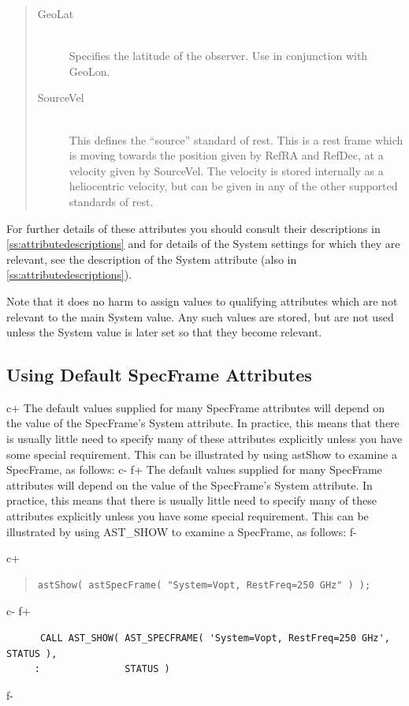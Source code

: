 \documentclass[twoside,11pt]{article}
\newcommand{\appref}[1]{Appendix~\ref{#1}}
\renewcommand{\appref}[1]{\ref{#1}}
\begin{document}
\begin{quote}
\begin{description}
\item[GeoLat]\mbox{}\\
Specifies the latitude of the observer. Use in conjunction with GeoLon.

\item[SourceVel]\mbox{}\\
This defines the ``source'' standard of rest. This is a rest frame which
is moving towards the position given by RefRA and RefDec, at a velocity
given by SourceVel. The velocity is stored internally as a heliocentric
velocity, but can be given in any of the other supported standards of rest.

\end{description}
\end{quote}

For further details of these attributes you should consult their
descriptions in \appref{ss:attributedescriptions} and for details of
the System settings for which they are relevant, see the description
of the System attribute (also in \appref{ss:attributedescriptions}).

Note that it does no harm to assign values to qualifying attributes
which are not relevant to the main System value. Any such values are
stored, but are not used unless the System value is later set so that
they become relevant.

\subsection{Using Default SpecFrame Attributes}

c+
The default values supplied for many SpecFrame attributes will depend
on the value of the SpecFrame's System attribute. In practice, this
means that there is usually little need to specify many of these
attributes explicitly unless you have some special requirement. This
can be illustrated by using astShow to examine a SpecFrame, as follows:
c-
f+
The default values supplied for many SpecFrame attributes will depend
on the value of the SpecFrame's System attribute. In practice, this
means that there is usually little need to specify many of these
attributes explicitly unless you have some special requirement. This
can be illustrated by using AST\_SHOW to examine a SpecFrame, as
follows:
f-

c+
\begin{quote}
\small
\begin{verbatim}
astShow( astSpecFrame( "System=Vopt, RestFreq=250 GHz" ) );
\end{verbatim}
\normalsize
\end{quote}
c-
f+
\small
\begin{verbatim}
      CALL AST_SHOW( AST_SPECFRAME( 'System=Vopt, RestFreq=250 GHz', STATUS ), 
     :               STATUS )
\end{verbatim}
\normalsize
f-
\end{document}
